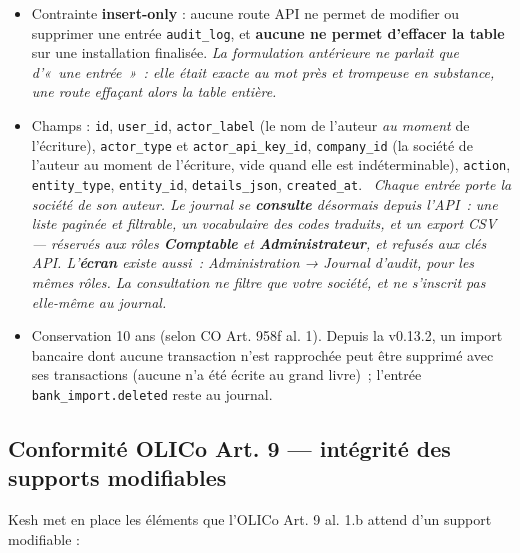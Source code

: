 \documentclass[a4paper,11pt,oneside]{article}
\begin{document}
\begin{itemize}
    \item Contrainte \textbf{insert-only} : aucune route API ne permet de modifier ou supprimer une entrée \texttt{audit\_log}, et \textbf{aucune ne permet d'effacer la table} sur une installation finalisée. \emph{La formulation antérieure ne parlait que d'«~une entrée~»~: elle était exacte au mot près et trompeuse en substance, une route effaçant alors la table entière.}
    \item Champs : \texttt{id}, \texttt{user\_id}, \texttt{actor\_label} (le nom de l'auteur \emph{au moment} de l'écriture), \texttt{actor\_type} et \texttt{actor\_api\_key\_id}, \texttt{company\_id} (la société de l'auteur au moment de l'écriture, vide quand elle est indéterminable), \texttt{action}, \texttt{entity\_type}, \texttt{entity\_id}, \texttt{details\_json}, \texttt{created\_at}. \keshAttention\ \emph{Chaque entrée porte la société de son auteur. Le journal se \textbf{consulte} désormais depuis l'API~: une liste paginée et filtrable, un vocabulaire des codes traduits, et un export CSV --- réservés aux rôles \textbf{Comptable} et \textbf{Administrateur}, et refusés aux clés API. L'\textbf{écran} existe aussi~: \emph{Administration} → \emph{Journal d'audit}, pour les mêmes rôles. La consultation ne filtre que votre société, et ne s'inscrit pas elle-même au journal.}
    \item Conservation 10 ans (selon CO Art. 958f al. 1). Depuis la v0.13.2, un import bancaire dont aucune transaction n'est rapprochée peut être supprimé avec ses transactions (aucune n'a été écrite au grand livre)~; l'entrée \texttt{bank\_import.deleted} reste au journal.
\end{itemize}

\subsection{Conformité OLICo Art. 9 — intégrité des supports modifiables}

Kesh met en place les éléments que l'OLICo Art. 9 al. 1.b attend d'un support modifiable :
\end{document}
